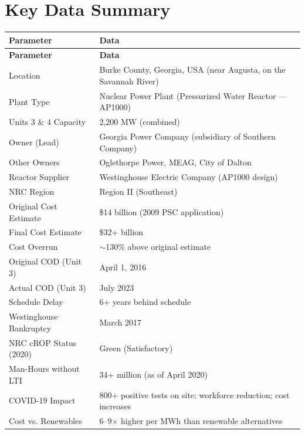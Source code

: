 \documentclass[12pt,a4paper]{article}
\begin{document}
\section{Key Data Summary}

\begin{center}
\begin{longtable}{p{4cm} p{9cm}}
\toprule
\textbf{Parameter} & \textbf{Data} \\
\midrule
\endfirsthead
\toprule
\textbf{Parameter} & \textbf{Data} \\
\midrule
\endhead
\bottomrule
\endfoot
Location & Burke County, Georgia, USA (near Augusta, on the Savannah River) \\[4pt]
Plant Type & Nuclear Power Plant (Pressurized Water Reactor --- AP1000) \\[4pt]
Units 3 \& 4 Capacity & 2,200 MW (combined) \\[4pt]
Owner (Lead) & Georgia Power Company (subsidiary of Southern Company) \\[4pt]
Other Owners & Oglethorpe Power, MEAG, City of Dalton \\[4pt]
Reactor Supplier & Westinghouse Electric Company (AP1000 design) \\[4pt]
NRC Region & Region II (Southeast) \\[4pt]
Original Cost Estimate & \$14 billion (2009 PSC application) \\[4pt]
Final Cost Estimate & \$32+ billion \\[4pt]
Cost Overrun & $\sim$130\% above original estimate \\[4pt]
Original COD (Unit 3) & April 1, 2016 \\[4pt]
Actual COD (Unit 3) & July 2023 \\[4pt]
Schedule Delay & 6+ years behind schedule \\[4pt]
Westinghouse Bankruptcy & March 2017 \\[4pt]
NRC cROP Status (2020) & Green (Satisfactory) \\[4pt]
Man-Hours without LTI & 34+ million (as of April 2020) \\[4pt]
COVID-19 Impact & 800+ positive tests on site; workforce reduction; cost increases \\[4pt]
Cost vs. Renewables & 6--9$\times$ higher per MWh than renewable alternatives \\[4pt]
\end{longtable}
\end{center}
\end{document}
